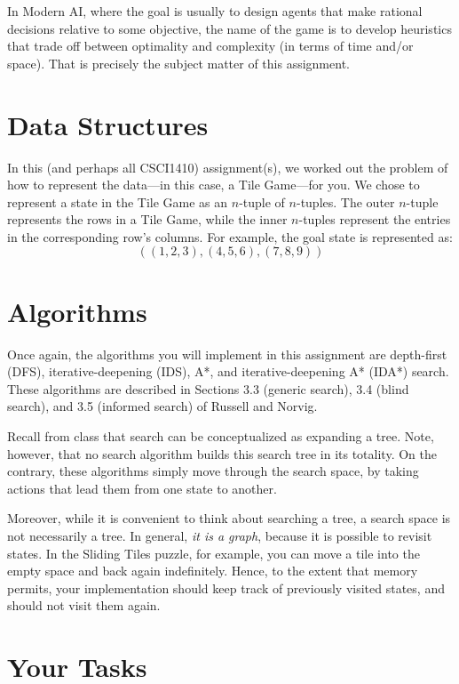 \documentclass{article}
\begin{document}
In Modern AI, where the goal is usually to design agents that make
rational decisions relative to some objective, the name of the game is
to develop heuristics that trade off between optimality and complexity
(in terms of time and/or space).  That is precisely the subject matter
of this assignment.


\section{Data Structures}

In this (and perhaps all CSCI1410) assignment(s), we worked out the
problem of how to represent the data---in this case, a Tile Game---for
you.  We chose to represent a state in the Tile Game as an $n$-tuple
of $n$-tuples.  The outer $n$-tuple represents the rows in a Tile
Game, while the inner $n$-tuples represent the entries in the
corresponding row's columns.  For example, the goal state is
represented as:
\[    
((1,2,3),(4,5,6),(7,8,9))
\]


\section{Algorithms}

Once again, the algorithms you will implement in this assignment are
depth-first (DFS),
iterative-deepening (IDS), A*, and iterative-deepening A* (IDA*) search.
These algorithms are described in Sections 3.3 (generic search),
3.4 (blind search), and 3.5 (informed search) of Russell and Norvig.

Recall from class that search can be conceptualized as expanding a tree.
Note, however, that no search algorithm builds this search tree in its totality.
On the contrary, these algorithms simply move through the search space,
by taking actions that lead them from one state to another.

Moreover, while it is convenient to think about searching a tree, a
search space is not necessarily a tree.  In general, \emph{it is a
  graph}, because it is possible to revisit states.  In the Sliding
Tiles puzzle, for example, you can move a tile into the empty space
and back again indefinitely.  Hence, to the extent that memory
permits, your implementation should keep track of previously visited
states, and should not visit them again.

\section{Your Tasks}
\end{document}
